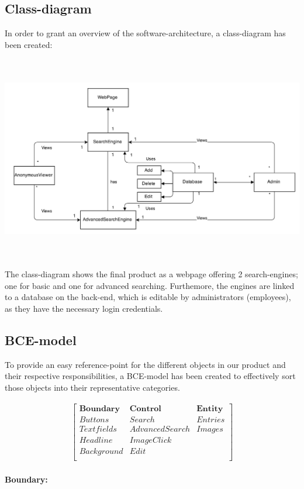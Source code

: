 \documentclass[12pt,a4paper]{article}
\begin{document}
\subsection{Class-diagram}

In order to grant an overview of the software-architecture, a class-diagram has been created:

\includegraphics[height=90mm]{ClassDiagram.png}

The class-diagram shows the final product as a webpage offering 2 search-engines; one for basic and one for advanced searching.
Furthemore, the engines are linked to a database on the back-end, which is editable by administrators (employees), as they have the necessary login credentials. 
\newpage
\subsection{BCE-model}

To provide an easy reference-point for the different objects in our product and their respective responsibilities, a BCE-model has been created to effectively sort those objects into their representative categories.

\begin{gather*}
\begin{bmatrix}
\textbf{Boundary}&\textbf{Control}&\textbf{Entity}\\
Buttons&Search&Entries\\
Textfields&Advanced Search&Images\\
Headline&ImageClick\\
Background&Edit\\
\end{bmatrix}
\end{gather*}\\
\textbf{Boundary:}\\
\end{document}
